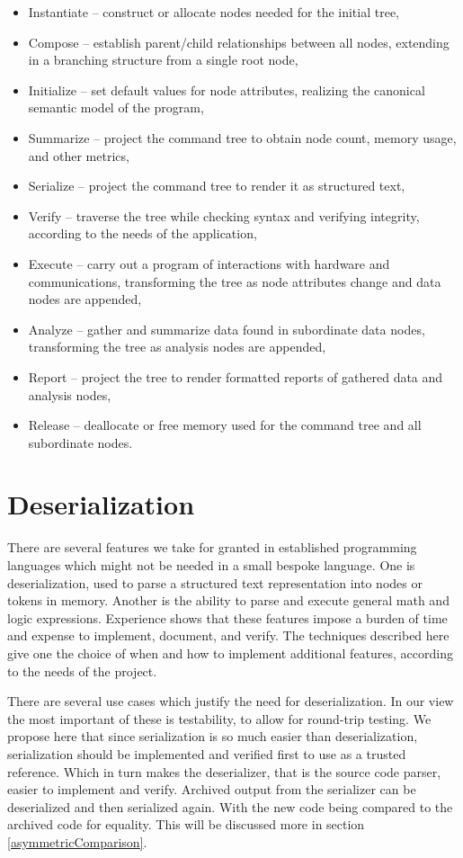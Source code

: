 \documentclass[a4paper,10pt]{article}
\begin{document}
\begin{itemize}
 \item Instantiate -- construct or allocate nodes needed for the initial tree,
 \item Compose -- establish parent/child relationships between all nodes, extending in a branching structure from a single root node,
 \item Initialize -- set default values for node attributes, realizing the canonical semantic model of the program,
 \item Summarize -- project the command tree to obtain node count, memory usage, and other metrics,
 \item Serialize -- project the command tree to render it as structured text,
 \item Verify -- traverse the tree while checking syntax and verifying integrity, according to the needs of the application,
 \item Execute -- carry out a program of interactions with hardware and communications, transforming the tree as node attributes change and data nodes are appended,
 \item Analyze -- gather and summarize data found in subordinate data nodes, transforming the tree as analysis nodes are appended,
 \item Report -- project the tree to render formatted reports of gathered data and analysis nodes,
 \item Release -- deallocate or free memory used for the command tree and all subordinate nodes.
\end{itemize}

\section{Deserialization}\label{Deserialization}

There are several features we take for granted in established programming languages which might not be needed in a small bespoke language. One is deserialization, used to parse a structured text representation into nodes or tokens in memory. Another is the ability to parse and execute general math and logic expressions. Experience shows that these features impose a burden of time and expense to implement, document, and verify. The techniques described here give one the choice of when and how to implement additional features, according to the needs of the project.

There are several use cases which justify the need for deserialization. In our view the most important of these is testability, to allow for round-trip testing. We propose here that since serialization is so much easier than deserialization, serialization should be implemented and verified first to use as a trusted reference. Which in turn makes the deserializer, that is the source code parser, easier to implement and verify. Archived output from the serializer can be deserialized and then serialized again. With the new code being compared to the archived code for equality. This will be discussed more in section \ref{asymmetricComparison}.
\end{document}
